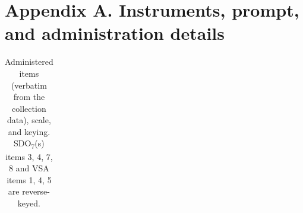 \documentclass[
]{article}
\begin{document}
\section*{Appendix A. Instruments, prompt, and administration
details}\label{appendix-a.-instruments-prompt-and-administration-details}

{

\begin{longtable}[]{@{}
  >{\raggedright\arraybackslash}p{}
  >{\raggedright\arraybackslash}p{}
  >{\raggedright\arraybackslash}p{}
  >{\raggedright\arraybackslash}p{}@{}}

\caption{\label{tbl-items}Administered items (verbatim from the
collection data), scale, and keying. SDO\textsubscript{7}(s) items 3, 4,
7, 8 and VSA items 1, 4, 5 are reverse-keyed.}

\tabularnewline


\end{longtable}}
\end{document}
